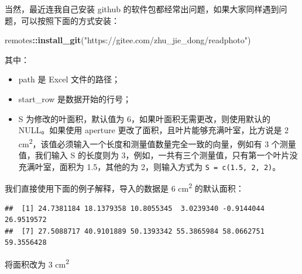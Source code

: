 \documentclass[
]{krantz}
\makeatletter
\newenvironment{Shaded}{\begin{snugshade}}{\end{snugshade}}
\newcommand{\DataTypeTok}[1]{\textcolor[rgb]{0.13,0.29,0.53}{#1}}
\newcommand{\DecValTok}[1]{\textcolor[rgb]{0.00,0.00,0.81}{#1}}
\newcommand{\KeywordTok}[1]{\textcolor[rgb]{0.13,0.29,0.53}{\textbf{#1}}}
\newcommand{\NormalTok}[1]{#1}
\newcommand{\OperatorTok}[1]{\textcolor[rgb]{0.81,0.36,0.00}{\textbf{#1}}}
\newcommand{\StringTok}[1]{\textcolor[rgb]{0.31,0.60,0.02}{#1}}
\newenvironment{kframe}{%
\medskip{}
\setlength{\fboxsep}{.8em}
 \def\at@end@of@kframe{}%
 \ifinner\ifhmode%
  \def\at@end@of@kframe{\end{minipage}}%
  \begin{minipage}{\columnwidth}%
 \fi\fi%
 \def\FrameCommand##1{\hskip\@totalleftmargin \hskip-\fboxsep
 \colorbox{shadecolor}{##1}\hskip-\fboxsep
     \hskip-\linewidth \hskip-\@totalleftmargin \hskip\columnwidth}%
 \MakeFramed {\advance\hsize-\width
   \@totalleftmargin\z@ \linewidth\hsize
   \@setminipage}}%
 {\par\unskip\endMakeFramed%
 \at@end@of@kframe}
\renewenvironment{Shaded}{\begin{kframe}}{\end{kframe}}
\makeatother
\begin{document}
当然，最近连我自己安装 github 的软件包都经常出问题，如果大家同样遇到问题，可以按照下面的方式安装：

\begin{Shaded}
\begin{Highlighting}[]
\NormalTok{remotes}\OperatorTok{::}\KeywordTok{install\_git}\NormalTok{(}\StringTok{"https://gitee.com/zhu\_jie\_dong/readphoto"}\NormalTok{)}
\end{Highlighting}
\end{Shaded}

其中：

\begin{itemize}
\item
  path 是 Excel 文件的路径；
\item
  start\_row 是数据开始的行号；
\item
  S 为修改的叶面积，默认值为 6，如果叶面积无需更改，则使用默认的 NULL。如果使用 aperture 更改了面积，且叶片能够充满叶室，比方说是 2 cm\textsuperscript{2}，该值必须输入一个长度和测量值数量完全一致的向量，例如有 3 个测量值，我们输入 S 的长度则为 3，例如，一共有三个测量值，只有第一个叶片没充满叶室，面积为 1.5，其他的为 2，则输入方式为 \texttt{S\ =\ c(1.5,\ 2,\ 2)}。
\end{itemize}

我们直接使用下面的例子解释，导入的数据是 6 cm\textsuperscript{2} 的默认面积：

\begin{Shaded}
\end{Shaded}

\begin{verbatim}
##  [1] 24.7381184 18.1379358 10.8055345  3.0239340 -0.9144044 26.9519572
##  [7] 27.5088717 40.9101889 50.1393342 55.3865984 58.0662751 59.3556428
\end{verbatim}

将面积改为 3 cm\textsuperscript{2}

\begin{Shaded}
\end{Shaded}
\end{document}

